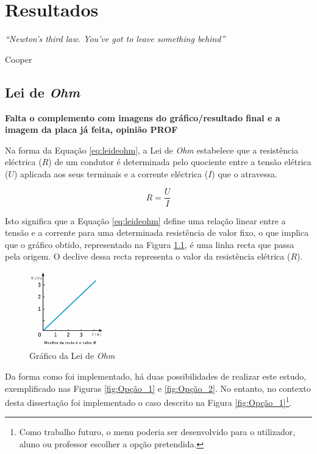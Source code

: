 \label{Capítulo5}
\chapter{Resultados}
\begin{center}
    \textit{``Newton's third law. You've got to leave something behind''}
     
     Cooper
\end{center}

\section{Lei de \textit{Ohm}}
\label{sec:resultados_lei_de_ohm}
\textbf{Falta o complemento com imagens do gráfico/resultado final e a imagem da placa já feita, opinião PROF}

Na forma da Equação \ref{eq:leideohm}, a Lei de \textit{Ohm} estabelece que a resistência eléctrica ($R$) de um condutor é determinada pelo quociente entre a tensão elétrica ($U$) aplicada aos seus terminais e a corrente eléctrica ($I$) que o atravessa.  

\begin{equation} \label{eq:leideohm}
	R=\dfrac{U}{I}
\end{equation}

Isto significa que a Equação \ref{eq:leideohm} define uma relação linear entre a tensão e a corrente para uma determinada resistência de valor fixo, o que implica que o gráfico obtido, representado na Figura \ref{fig:graphohm}, é uma linha recta que passa pela origem. O declive dessa recta representa o valor da resistência elétrica ($R$).

\begin{figure}[hbtp]
	\centering
	\includegraphics[width=0.3\textwidth]{figures/grafico_Ohm.png}
	\caption{Gráfico da Lei de \textit{Ohm}}
	\label{fig:graphohm}
\end{figure}

Da forma como foi implementado, há duas possibilidades de realizar este estudo, exemplificado nas Figuras \ref{fig:Opção_1} e \ref{fig:Opção_2}. No entanto, no contexto desta dissertação foi  implementado o caso descrito na Figura \ref{fig:Opção_1}\footnote{Como trabalho futuro, o menu poderia ser desenvolvido para o utilizador, aluno ou professor escolher a opção pretendida.}. 


